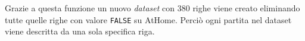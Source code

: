 Grazie a questa funzione un nuovo \emph{dataset} con 380 righe viene creato eliminando tutte quelle righe con valore \texttt{FALSE} su \textsf{AtHome}. Perciò ogni partita nel dataset viene descritta da una sola specifica riga.\\
\begin{comment}


Di seguito vengono riportati i comandi fatti per applicare le modifiche al \emph{dataset}.

\begin{lstlisting}[language=R]
	> AdjserieA2 <- AdjserieA[-del,]
\end{lstlisting}

Con il precedente comando si va a creare un nuovo \emph{dataset} con 380 righe, eliminando tutte quelle righe con valore \texttt{FALSE} su \textsf{AtHome}. \\
Con il comando \ref{sec:a2} si va a modificare \textsf{Team} rendendolo un \texttt{data.frame}, andando a inserire i dati della riga relativi alla squadra che gioca in casa. Si inserisce come chiave \texttt{team = AdjserieA2\$Team} e si indica che la partita è in casa per la squadra di riferimento con \texttt{at.home = 1}.\\

\begin{lstlisting}[language=R, caption={Codice per la creazione del data.frame Team}, label=sec:a2] 
	> AdjserieA2$Team <- data.frame(team = AdjserieA2$Team, GF = AdjserieA2$GF, GA = AdjserieA2$GA,  at.home = 1, Poss = AdjserieA2$Poss, Sh = AdjserieA2$Sh, SoT = AdjserieA2$SoT, G.Sh = AdjserieA2$G.Sh, PAtt = AdjserieA2$PAtt, PCmp. = AdjserieA2$PCmp., SPAtt = AdjserieA2$SPAtt, SPCmp. = AdjserieA2$SPCmp., MPAtt = AdjserieA2$MPAtt, MPCmp. = AdjserieA2$MPCmp., LPAtt = AdjserieA2$LPAtt, LPCmp. = AdjserieA2$LPCmp., ToDef3rd = AdjserieA2$ToDef3rd, ToAtt3rd = AdjserieA2$ToAtt3rd, ToAttPen = AdjserieA2$ToAttPen, TotDist = AdjserieA2$TotDist, Fls = AdjserieA2$Fls, Fld = AdjserieA2$Fld, Crs = AdjserieA2$Crs, Int = AdjserieA2$Int, TklWin = AdjserieA2$TklWin, Recov = AdjserieA2$Recov)
\end{lstlisting}
\bigskip

Con il comando \ref{sec:a3} si va a modificare \textsf{Vs} rendendolo un \texttt{data.frame}, andando a inserire i dati della riga relativi alla squadra che gioca fuori casa. Si inserisce come chiave \texttt{team = AdjserieA2\$Vs} e si indica che la partita è fuori casa per la squadra \texttt{Vs} con \texttt{at.home = 0}. Per quanto riguarda il resto dei dati, vengono riportati attraverso l'inserimento dei vettori costruiti e riempiti precedentemente.\\


\end{comment}
